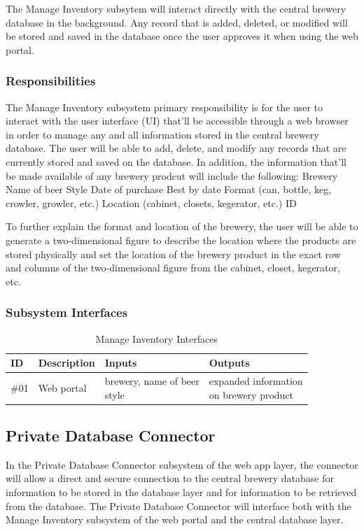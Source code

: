 The Manage Inventory subsytem will interact directly with the central brewery database in the background.  Any record that is added, deleted, or modified will be stored and saved in the database once the user approves it when using the web portal.

\subsubsection{Responsibilities}
The Manage Inventory subsystem primary responsibility is for the user to interact with the user interface (UI) that'll be accessible through a web browser in order to manage any and all information stored in the central brewery database.  The user will be able to add, delete, and modify any records that are currently stored and saved on the database.  In addition, the information that'll be made available of any brewery prodcut will include the following:
Brewery
Name of beer
Style
Date of purchase
Best by date
Format (can, bottle, keg, crowler, growler, etc.)
Location (cabinet, closets, kegerator, etc.)
ID

To further explain the format and location of the brewery, the user will be able to generate a two-dimensional figure to describe the location where the products are stored physically and set the location of the brewery product in the exact row and columns of the two-dimensional figure from the cabinet, closet, kegerator, etc.

\subsubsection{Subsystem Interfaces}

\begin {table}[H]
\caption {Manage Inventory Interfaces} 
\begin{center}
    \begin{tabular}{ | p{1cm} | p{6cm} | p{3cm} | p{3cm} |}
    \hline
    ID & Description & Inputs & Outputs \\ \hline
    \#01 & Web portal & \pbox{3cm}{brewery, name of beer \\ style} & \pbox{3cm}{expanded information \\ on brewery product}  \\ \hline
    \end{tabular}
\end{center}
\end{table}

\subsection{Private Database Connector}
In the Private Database Connector subsystem of the web app layer, the connector will allow a direct and secure connection to the central brewery database for information to be stored in the database layer and for information to be retrieved from the database.  The Private Database Connector will interface both with the Manage Inventory subsystem of the web portal and the central database layer.

